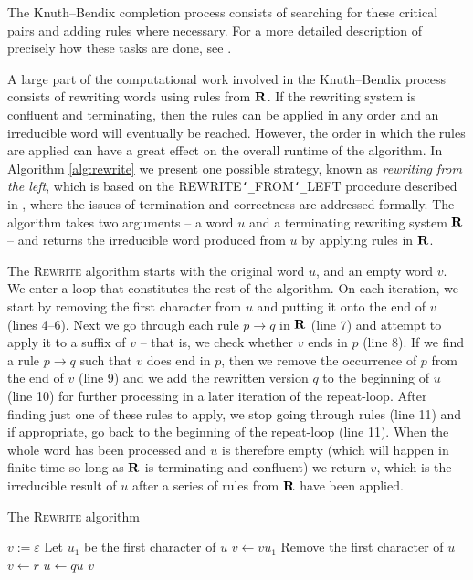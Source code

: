 The Knuth--Bendix completion process consists of searching for these critical
pairs and adding rules where necessary.  For a more detailed description of
precisely how these tasks are done, see \cite[\S 2.6]{sims}.

A large part of the computational work involved in the Knuth--Bendix process
consists of rewriting words using rules from $\mathbf{R}$.  If the rewriting system is
confluent and terminating, then the rules can be applied in any order and an
irreducible word will eventually be reached.  However, the order in which the
rules are applied can have a great effect on the overall runtime of the
algorithm.  In Algorithm \ref{alg:rewrite} we present one possible strategy,
known as \textit{rewriting from the left}, which is based on the
REWRITE\texttt{\char`_}FROM\texttt{\char`_}LEFT procedure described in
\cite[\S2.4]{sims}, where the issues of termination and correctness are
addressed formally.  The algorithm takes two arguments -- a word $u$ and a terminating
rewriting system $\mathbf{R}$ -- and returns the irreducible word produced from $u$ by
applying rules in $\mathbf{R}$.

The \textsc{Rewrite} algorithm starts with the original word $u$, and an empty
word $v$.  We enter a loop that constitutes the rest of the algorithm.  On each
iteration, we start by removing the first character from $u$ and putting it onto
the end of $v$ (lines 4--6).  Next we go through each rule $p \to q$ in $\mathbf{R}$
(line 7) and attempt to apply it to a suffix of $v$ -- that is, we check whether
$v$ ends in $p$ (line 8).  If we find a rule $p \to q$ such that $v$ does end in
$p$, then we remove the occurrence of $p$ from the end of $v$ (line 9) and we
add the rewritten version $q$ to the beginning of $u$ (line 10) for further
processing in a later iteration of the repeat-loop.  After finding just one of
these rules to apply, we stop going through rules (line 11) and if appropriate,
go back to the beginning of the repeat-loop (line 11).  When the whole word has
been processed and $u$ is therefore empty (which will happen in finite time so
long as $\mathbf{R}$ is terminating and confluent) we return $v$, which is the
irreducible result of $u$ after a series of rules from $\mathbf{R}$ have been applied.

\begin{algorithm}
\caption{The \textsc{Rewrite} algorithm}
\label{alg:rewrite}
\begin{algorithmic}[1]
\State $v := \varepsilon$
  \State Let $u_1$ be the first character of $u$
  \State $v \gets v u_1$
  \State Remove the first character of $u$
      \State $v \gets r$
      \State $u \gets qu$
      \State \Break
    \EndIf
  \EndFor
\EndWhile
\State \Return $v$
\EndProcedure
\end{algorithmic}
\end{algorithm}

